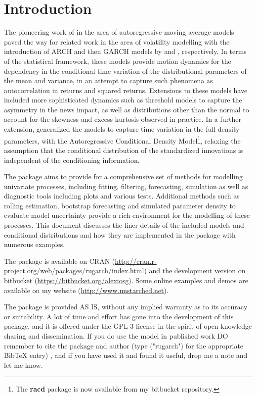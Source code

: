 \section{Introduction}
The pioneering work of \cite{Box1994} in the area of autoregressive moving
average models paved the way for related work in the area of volatility
modelling with the introduction of ARCH and then GARCH models by \cite{Engle1982}
and \cite{Bollerslev1986}, respectively. In terms of the statistical framework,
these models provide motion dynamics for the dependency in the conditional
time variation of the distributional parameters of the mean and variance, in an
attempt to capture such phenomena as autocorrelation in returns and squared
returns. Extensions to these models have included more sophisticated dynamics
such as threshold models to capture the asymmetry in the news impact, as well
as distributions other than the normal to account for the skewness and excess
kurtosis observed in practice. In a further extension, \cite{Hansen1994}
generalized the \verb@GARCH@ models to capture time variation in the full density
parameters, with the Autoregressive Conditional Density Model\footnote{The \textbf{racd} package
is now available from my bitbucket repository.}, relaxing the assumption that the
conditional distribution of the standardized innovations is independent of the
conditioning information.

The \verb@rugarch@ package aims to provide for a comprehensive set of methods
for modelling univariate \verb@GARCH@ processes, including fitting, filtering,
forecasting, simulation as well as diagnostic tools including plots and various
tests. Additional methods such as rolling estimation, bootstrap forecasting and
simulated parameter density to evaluate model uncertainty provide a rich
environment for the modelling of these processes. This document discusses the
finer details of the included models and conditional distributions and
how they are implemented in the package with numerous examples.

The \verb@rugarch@ package is available on CRAN
(\url{http://cran.r-project.org/web/packages/rugarch/index.html}) and the
development version on bitbucket (\url{https://bitbucket.org/alexiosg}).
Some online examples and demos are available on my website
(\url{http://www.unstarched.net}).

The package is provided AS IS, without any implied warranty as to its accuracy
or suitability. A lot of time and effort has gone into the development of this
package, and it is offered under the GPL-3 license in the spirit of open
knowledge sharing and dissemination. If you do use the model in published work
DO remember to cite the package and author (type \verb@citation@("rugarch") for
the appropriate BibTeX entry) , and if you have used it and found it
useful, drop me a note and let me know.

